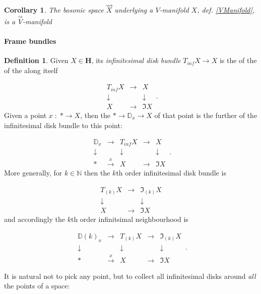 \documentclass[12pt,titlepage]{article}
\newcommand{\itexarray}[1]{\begin{matrix}#1\end{matrix}}
\theoremstyle{plain}
\newtheorem{cor}{Corollary}
\theoremstyle{definition}
\newtheorem{defn}{Definition}
\theoremstyle{remark}
\begin{document}
\begin{cor}
\label{}\hypertarget{}{}
The bosonic space $\stackrel{\rightsquigarrow}{X}$ underlying a $V$-manifold $X$, def. \ref{VManifold}, is a $\stackrel{\rightsquigarrow}{V}$-manifold

\end{cor}
\hypertarget{FrameBundles}{}\paragraph*{{Frame bundles}}\label{FrameBundles}

\begin{defn}
\label{InfinitesimalDiskBundle}\hypertarget{InfinitesimalDiskBundle}{}
Given $X \in \mathbf{H}$, its \emph{infinitesimal disk bundle} $T_{inf} X\to X$ is the  of the  of the  along itself

\begin{displaymath}
\itexarray{
    T_{inf} X &\stackrel{}{\longrightarrow}& X
    \\
    \downarrow && \downarrow
    \\
    X &\longrightarrow& \Im X
  }
  \,.
\end{displaymath}
Given a point $x \;\colon\;  \ast \to X$, then the  $\ast \to \mathbb{D}_x \to X$ of that point is the further  of the infinitesimal disk bundle to this point:

\begin{displaymath}
\itexarray{
    \mathbb{D}_x &\longrightarrow & T_{inf} X &\stackrel{}{\longrightarrow}& X
    \\
    \downarrow && \downarrow && \downarrow
    \\
    \ast &\stackrel{x}{\longrightarrow} & X &\longrightarrow& \Im X
  }
  \,.
\end{displaymath}
More generally, for $k \in \mathbb{N}$ then the $k$th order infinitesimal disk bundle is

\begin{displaymath}
\itexarray{
    T_{(k)} X &\stackrel{}{\longrightarrow}& \Im_{(k)} X
    \\
    \downarrow && \downarrow
    \\
    X &\longrightarrow& \Im X
  }
\end{displaymath}
and accordingly the $k$th order infinitsimal neighbourhood is

\begin{displaymath}
\itexarray{
    \mathbb{D}(k)_x &\longrightarrow & T_{(k)} X &\stackrel{}{\longrightarrow}& \Im_{(k)}X
    \\
    \downarrow && \downarrow && \downarrow
    \\
    \ast &\stackrel{x}{\longrightarrow} & X &\longrightarrow& \Im X
  }
  \,.
\end{displaymath}
\end{defn}
It is natural not to pick any point, but to collect all infinitesimal disks around \emph{all} the points of a space:
\end{document}
